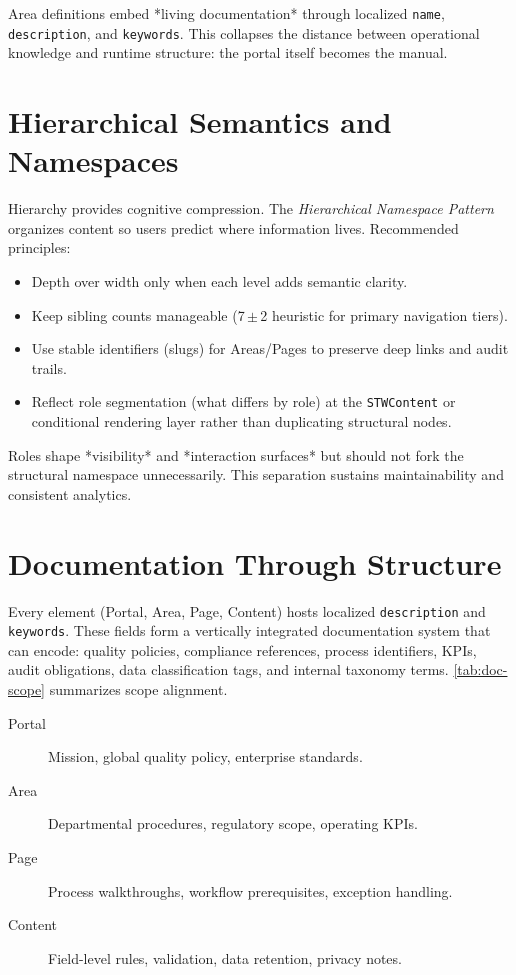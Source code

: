 Area definitions embed *living documentation* through localized \texttt{name}, \texttt{description}, and \texttt{keywords}. This collapses the distance between operational knowledge and runtime structure: the portal itself becomes the manual.

\section{Hierarchical Semantics and Namespaces}
Hierarchy provides cognitive compression. The \emph{Hierarchical Namespace Pattern} organizes content so users predict where information lives. Recommended principles:
\begin{itemize}
	\item Depth over width only when each level adds semantic clarity.
	\item Keep sibling counts manageable (7\,$\pm$\,2 heuristic for primary navigation tiers).
	\item Use stable identifiers (slugs) for Areas/Pages to preserve deep links and audit trails.
	\item Reflect role segmentation (what differs by role) at the \texttt{STWContent} or conditional rendering layer rather than duplicating structural nodes.
\end{itemize}
Roles shape *visibility* and *interaction surfaces* but should not fork the structural namespace unnecessarily. This separation sustains maintainability and consistent analytics.

\section{Documentation Through Structure}
Every \wbol{} element (Portal, Area, Page, Content) hosts localized \texttt{description} and \texttt{keywords}. These fields form a vertically integrated documentation system that can encode: quality policies, compliance references, process identifiers, KPIs, audit obligations, data classification tags, and internal taxonomy terms. \autoref{tab:doc-scope} summarizes scope alignment.

\begin{description}
	\item[Portal] Mission, global quality policy, enterprise standards.
	\item[Area] Departmental procedures, regulatory scope, operating KPIs.
	\item[Page] Process walkthroughs, workflow prerequisites, exception handling.
	\item[Content] Field-level rules, validation, data retention, privacy notes.
\end{description}


